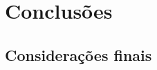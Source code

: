 
\chapter{Conclusões}\label{cap:Concl}
\vspace{-1cm}

%
%



\section{Considerações finais}\label{sec:Cons_finais}


